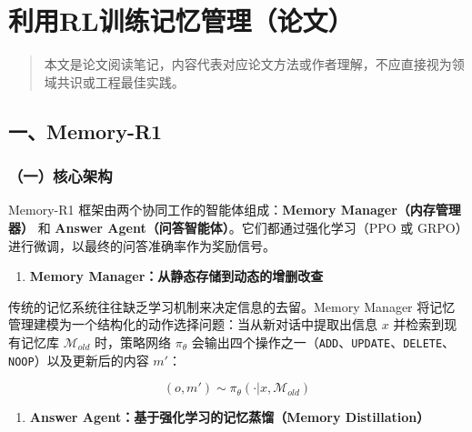 \clearpage

\hypertarget{ux5229ux7528rlux8badux7ec3ux8bb0ux5fc6ux7ba1ux7406ux8bbaux6587}{%
\section{利用RL训练记忆管理（论文）}\label{ux5229ux7528rlux8badux7ec3ux8bb0ux5fc6ux7ba1ux7406ux8bbaux6587}}

\begin{quote}
本文是论文阅读笔记，内容代表对应论文方法或作者理解，不应直接视为领域共识或工程最佳实践。
\end{quote}

\hypertarget{ux4e00memory-r1}{%
\subsection{一、Memory-R1}\label{ux4e00memory-r1}}

\hypertarget{ux4e00ux6838ux5fc3ux67b6ux6784-3}{%
\subsubsection{（一）核心架构}\label{ux4e00ux6838ux5fc3ux67b6ux6784-3}}

Memory-R1 框架由两个协同工作的智能体组成：\textbf{Memory Manager（内存管理器）} 和 \textbf{Answer Agent（问答智能体）}。它们都通过强化学习（PPO 或 GRPO）进行微调，以最终的问答准确率作为奖励信号。

\begin{enumerate}
\def\labelenumi{\arabic{enumi}.}
\tightlist
\item
  \textbf{Memory Manager：从静态存储到动态的增删改查}
\end{enumerate}

传统的记忆系统往往缺乏学习机制来决定信息的去留。Memory Manager 将记忆管理建模为一个结构化的动作选择问题：当从新对话中提取出信息 \(x\) 并检索到现有记忆库 \(\mathcal{M}_{old}\) 时，策略网络 \(\pi_\theta\) 会输出四个操作之一（\texttt{ADD}、\texttt{UPDATE}、\texttt{DELETE}、\texttt{NOOP}）以及更新后的内容 \(m'\)：

\[
(o,m') \sim \pi_\theta(\cdot|x,\mathcal{M}_{old})
\]

\begin{enumerate}
\def\labelenumi{\arabic{enumi}.}
\setcounter{enumi}{1}
\tightlist
\item
  \textbf{Answer Agent：基于强化学习的记忆蒸馏（Memory Distillation）}
\end{enumerate}


